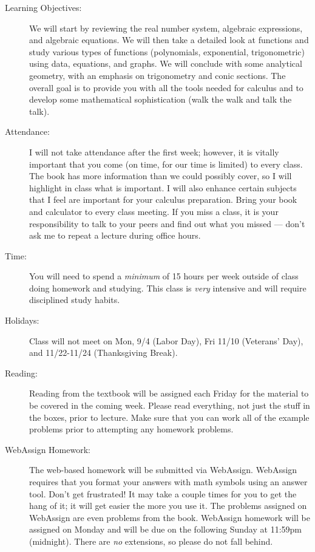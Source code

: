 \documentclass[letterpaper,12pt,fleqn]{article}
\begin{document}
\begin{description}
\item[Learning Objectives:] We will start by reviewing the real number system, algebraic
  expressions, and algebraic equations. We will then take a detailed look at functions
  and study various types of functions (polynomials, exponential, trigonometric) using
  data, equations, and graphs. We will conclude with some analytical geometry, with an
  emphasis on trigonometry and conic sections. The overall goal is to provide you with
  all the tools needed for calculus and to develop some mathematical sophistication
  (walk the walk and talk the talk).

\item[Attendance:] I will not take attendance after the first week; however, it is
  vitally important that you come (on time, for our time is limited) to every class. The
  book has more information than we could possibly cover, so I will highlight in class
  what is important. I will also enhance certain subjects that I feel are important for
  your calculus preparation. Bring your book and calculator to every class meeting. If
  you miss a class, it is your responsibility to talk to your peers and find out what
  you missed --- don't ask me to repeat a lecture during office hours.

\item[Time:] You will need to spend a \emph{minimum} of 15 hours per week outside of
  class doing homework and studying. This class is \emph{very} intensive and will
  require disciplined study habits.

\item[Holidays:] Class will not meet on Mon, 9/4 (Labor Day), Fri 11/10 (Veterans' Day),
  and 11/22-11/24 (Thanksgiving Break).

\item[Reading:] Reading from the textbook will be assigned each Friday for the material
  to be covered in the coming week. Please read everything, not just the stuff in the
  boxes, prior to lecture. Make sure that you can work all of the example problems prior
  to attempting any homework problems.

\item[WebAssign Homework:] The web-based homework will be submitted via WebAssign.
  Web\-Assign requires that you format your answers with math symbols using an answer
  tool. Don't get frustrated! It may take a couple times for you to get the hang of it;
  it will get easier the more you use it. The problems assigned on WebAssign are even
  problems from the book. WebAssign homework will be assigned on Monday and will be due
  on the following Sunday at 11:59pm (midnight). There are \emph{no} extensions, so
  please do not fall behind.


\end{description}
\end{document}
